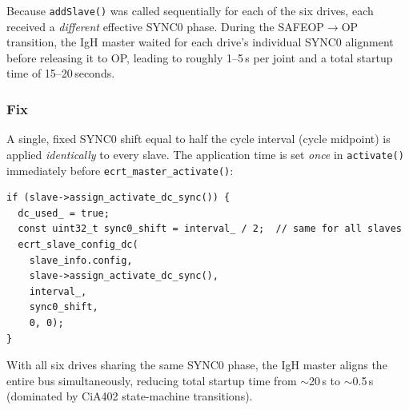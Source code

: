 \documentclass[11pt,a4paper]{article}
\begin{document}
Because \texttt{addSlave()} was called sequentially for each of the six
drives, each received a \emph{different} effective SYNC0 phase.  During the
SAFEOP$\to$OP transition, the IgH master waited for each drive's individual
SYNC0 alignment before releasing it to OP, leading to roughly 1--5\,s per
joint and a total startup time of 15--20\,seconds.

\begin{center}
\end{center}

\subsubsection{Fix}

A single, fixed SYNC0 shift equal to half the cycle interval (cycle midpoint)
is applied \emph{identically} to every slave.  The application time is set
\emph{once} in \texttt{activate()} immediately before
\texttt{ecrt\_master\_activate()}:

\begin{lstlisting}[caption={Fixed SYNC0 shift in \texttt{addSlave()}}]
if (slave->assign_activate_dc_sync()) {
  dc_used_ = true;
  const uint32_t sync0_shift = interval_ / 2;  // same for all slaves
  ecrt_slave_config_dc(
    slave_info.config,
    slave->assign_activate_dc_sync(),
    interval_,
    sync0_shift,
    0, 0);
}
\end{lstlisting}

With all six drives sharing the same SYNC0 phase, the IgH master aligns the
entire bus simultaneously, reducing total startup time from $\sim$20\,s to
$\sim$0.5\,s (dominated by CiA402 state-machine transitions).
\end{document}
